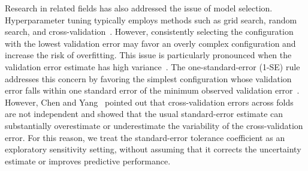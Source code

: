 Research in related fields has also addressed the issue of model selection.
Hyperparameter tuning typically employs methods such as grid search, random search, and cross-validation~\cite{bergstra2012random,kohavi1995study,hyndman2018forecasting}.
However, consistently selecting the configuration with the lowest validation error may favor an overly complex configuration and increase the risk of overfitting.
This issue is particularly pronounced when the validation error estimate has high variance~\cite{cawley2010over}.
The one-standard-error (1-SE) rule addresses this concern by favoring the simplest configuration whose validation error falls within one standard error of the minimum observed validation error~\cite{breiman2017classification,hastie2009elements}.
However, Chen and Yang~\cite{chen2021one} pointed out that cross-validation errors across folds are not independent and showed that the usual standard-error estimate can substantially overestimate or underestimate the variability of the cross-validation error.
For this reason, we treat the standard-error tolerance coefficient as an exploratory sensitivity setting, without assuming that it corrects the uncertainty estimate or improves predictive performance.
